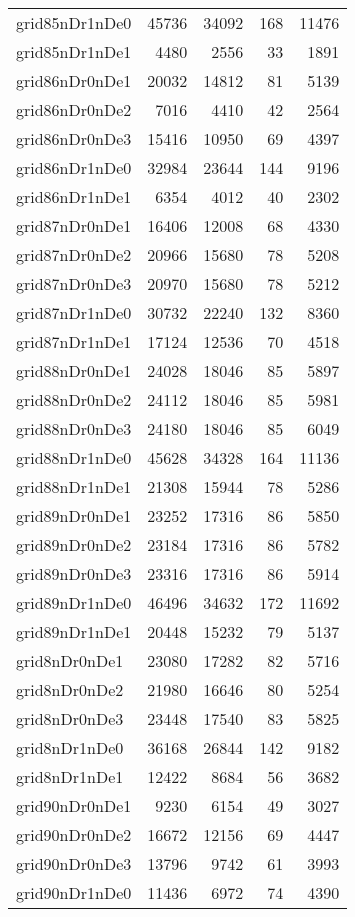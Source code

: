 \begin{tabular}{lrrrr}
grid85nDr1nDe0 & 45736 & 34092 & 168 & 11476 \\
grid85nDr1nDe1 & 4480 & 2556 & 33 & 1891 \\
grid86nDr0nDe1 & 20032 & 14812 & 81 & 5139 \\
grid86nDr0nDe2 & 7016 & 4410 & 42 & 2564 \\
grid86nDr0nDe3 & 15416 & 10950 & 69 & 4397 \\
grid86nDr1nDe0 & 32984 & 23644 & 144 & 9196 \\
grid86nDr1nDe1 & 6354 & 4012 & 40 & 2302 \\
grid87nDr0nDe1 & 16406 & 12008 & 68 & 4330 \\
grid87nDr0nDe2 & 20966 & 15680 & 78 & 5208 \\
grid87nDr0nDe3 & 20970 & 15680 & 78 & 5212 \\
grid87nDr1nDe0 & 30732 & 22240 & 132 & 8360 \\
grid87nDr1nDe1 & 17124 & 12536 & 70 & 4518 \\
grid88nDr0nDe1 & 24028 & 18046 & 85 & 5897 \\
grid88nDr0nDe2 & 24112 & 18046 & 85 & 5981 \\
grid88nDr0nDe3 & 24180 & 18046 & 85 & 6049 \\
grid88nDr1nDe0 & 45628 & 34328 & 164 & 11136 \\
grid88nDr1nDe1 & 21308 & 15944 & 78 & 5286 \\
grid89nDr0nDe1 & 23252 & 17316 & 86 & 5850 \\
grid89nDr0nDe2 & 23184 & 17316 & 86 & 5782 \\
grid89nDr0nDe3 & 23316 & 17316 & 86 & 5914 \\
grid89nDr1nDe0 & 46496 & 34632 & 172 & 11692 \\
grid89nDr1nDe1 & 20448 & 15232 & 79 & 5137 \\
grid8nDr0nDe1 & 23080 & 17282 & 82 & 5716 \\
grid8nDr0nDe2 & 21980 & 16646 & 80 & 5254 \\
grid8nDr0nDe3 & 23448 & 17540 & 83 & 5825 \\
grid8nDr1nDe0 & 36168 & 26844 & 142 & 9182 \\
grid8nDr1nDe1 & 12422 & 8684 & 56 & 3682 \\
grid90nDr0nDe1 & 9230 & 6154 & 49 & 3027 \\
grid90nDr0nDe2 & 16672 & 12156 & 69 & 4447 \\
grid90nDr0nDe3 & 13796 & 9742 & 61 & 3993 \\
grid90nDr1nDe0 & 11436 & 6972 & 74 & 4390 \\

\end{tabular}
